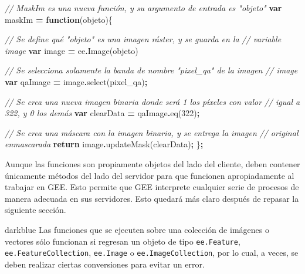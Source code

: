 \documentclass[
  12pt,
  letterpaper,
  twoside]{book}
\newenvironment{Shaded}{\begin{snugshade}}{\end{snugshade}}
\newcommand{\CommentTok}[1]{\textcolor[rgb]{0.56,0.35,0.01}{\textit{#1}}}
\newcommand{\ControlFlowTok}[1]{\textcolor[rgb]{0.13,0.29,0.53}{\textbf{#1}}}
\newcommand{\DecValTok}[1]{\textcolor[rgb]{0.00,0.00,0.81}{#1}}
\newcommand{\FunctionTok}[1]{\textcolor[rgb]{0.00,0.00,0.00}{#1}}
\newcommand{\KeywordTok}[1]{\textcolor[rgb]{0.13,0.29,0.53}{\textbf{#1}}}
\newcommand{\NormalTok}[1]{#1}
\newcommand{\OperatorTok}[1]{\textcolor[rgb]{0.81,0.36,0.00}{\textbf{#1}}}
\newcommand{\StringTok}[1]{\textcolor[rgb]{0.31,0.60,0.02}{#1}}
\begin{document}
\begin{Shaded}
\begin{Highlighting}[]
\CommentTok{// MaskIm es una nueva función, y su argumento de entrada es "objeto"}
\KeywordTok{var}\NormalTok{ maskIm }\OperatorTok{=} \KeywordTok{function}\NormalTok{(objeto)\{ }

\CommentTok{// Se define qué "objeto" es una imagen ráster, y se guarda en la }
\CommentTok{// variable image}
\KeywordTok{var}\NormalTok{ image }\OperatorTok{=}\NormalTok{ ee}\OperatorTok{.}\FunctionTok{Image}\NormalTok{(objeto)     }
 
\CommentTok{// Se selecciona solamente la banda de nombre "pixel\_qa" de la imagen}
\CommentTok{// image}
\KeywordTok{var}\NormalTok{ qaImage }\OperatorTok{=}\NormalTok{ image}\OperatorTok{.}\FunctionTok{select}\NormalTok{(}\StringTok{\textquotesingle{}pixel\_qa\textquotesingle{}}\NormalTok{)}\OperatorTok{;}
     
\CommentTok{// Se crea una nueva imagen binaria donde será 1 los píxeles con valor }
\CommentTok{// igual a 322, y 0 los demás}
\KeywordTok{var}\NormalTok{ clearData }\OperatorTok{=}\NormalTok{ qaImage}\OperatorTok{.}\FunctionTok{eq}\NormalTok{(}\DecValTok{322}\NormalTok{)}\OperatorTok{;}      
    
\CommentTok{// Se crea una máscara con la imagen binaria, y se entrega la imagen }
\CommentTok{// original enmascarada}
\ControlFlowTok{return}\NormalTok{ image}\OperatorTok{.}\FunctionTok{updateMask}\NormalTok{(clearData)}\OperatorTok{;}      
\NormalTok{ \}}\OperatorTok{;}
\end{Highlighting}
\end{Shaded}

Aunque las funciones son propiamente objetos del lado del cliente, deben contener únicamente métodos del lado del servidor para que funcionen apropiadamente al trabajar en GEE. Esto permite que GEE interprete cualquier serie de procesos de manera adecuada en sus servidores. Esto quedará más claro después de repasar la siguiente sección.

\begin{bluebox2}

\begin{awesomeblock}{5pt}{\faLightbulb}{darkblue}
Las funciones que se ejecuten sobre una colección de imágenes o vectores sólo funcionan si regresan un objeto de tipo \texttt{ee.Feature}, \texttt{ee.FeatureCollection}, \texttt{ee.Image} o \texttt{ee.ImageCollection}, por lo cual, a veces, se deben realizar ciertas conversiones para evitar un error.

\end{awesomeblock}

\end{bluebox2}
\end{document}
